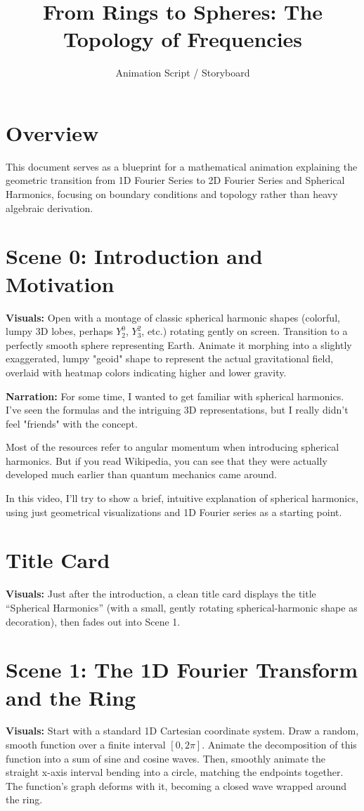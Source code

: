 \documentclass[12pt]{article}
\title{From Rings to Spheres: The Topology of Frequencies}
\author{Animation Script / Storyboard}
\date{}
\begin{document}
\maketitle

\section*{Overview}
This document serves as a blueprint for a mathematical animation explaining the geometric transition from 1D Fourier Series to 2D Fourier Series and Spherical Harmonics, focusing on boundary conditions and topology rather than heavy algebraic derivation.

\section*{Scene 0: Introduction and Motivation}
\textbf{Visuals:}
Open with a montage of classic spherical harmonic shapes (colorful, lumpy 3D lobes, perhaps $Y_2^0$, $Y_3^2$, etc.) rotating gently on screen. 
Transition to a perfectly smooth sphere representing Earth. Animate it morphing into a slightly exaggerated, lumpy "geoid" shape to represent the actual gravitational field, overlaid with heatmap colors indicating higher and lower gravity.

\textbf{Narration:}
For some time, I wanted to get familiar with spherical harmonics. I've seen the formulas and the intriguing 3D representations, but I really didn't feel "friends" with the concept. 

Most of the resources refer to angular momentum when introducing spherical harmonics. But if you read Wikipedia, you can see that they were actually developed much earlier than quantum mechanics came around. 

In this video, I'll try to show a brief, intuitive explanation of spherical harmonics, using just geometrical visualizations and 1D Fourier series as a starting point.

\section*{Title Card}
\textbf{Visuals:}
Just after the introduction, a clean title card displays the title ``Spherical Harmonics'' (with a small, gently rotating spherical-harmonic shape as decoration), then fades out into Scene 1.

\section*{Scene 1: The 1D Fourier Transform and the Ring}
\textbf{Visuals:} 
Start with a standard 1D Cartesian coordinate system. Draw a random, smooth function over a finite interval $[0, 2\pi]$. Animate the decomposition of this function into a sum of sine and cosine waves. 
Then, smoothly animate the straight x-axis interval bending into a circle, matching the endpoints together. The function's graph deforms with it, becoming a closed wave wrapped around the ring.
\end{document}
